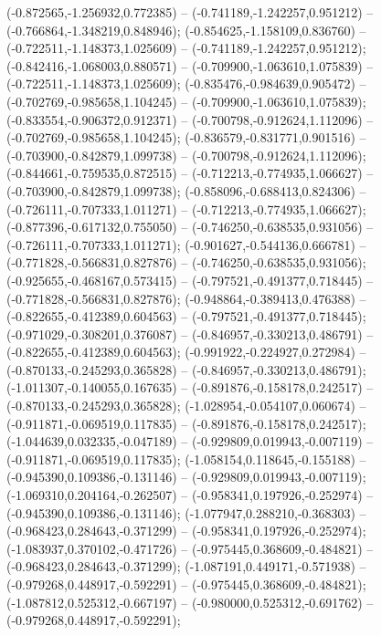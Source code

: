  (-0.872565,-1.256932,0.772385) -- (-0.741189,-1.242257,0.951212) -- (-0.766864,-1.348219,0.848946);
 (-0.854625,-1.158109,0.836760) -- (-0.722511,-1.148373,1.025609) -- (-0.741189,-1.242257,0.951212);
 (-0.842416,-1.068003,0.880571) -- (-0.709900,-1.063610,1.075839) -- (-0.722511,-1.148373,1.025609);
 (-0.835476,-0.984639,0.905472) -- (-0.702769,-0.985658,1.104245) -- (-0.709900,-1.063610,1.075839);
 (-0.833554,-0.906372,0.912371) -- (-0.700798,-0.912624,1.112096) -- (-0.702769,-0.985658,1.104245);
 (-0.836579,-0.831771,0.901516) -- (-0.703900,-0.842879,1.099738) -- (-0.700798,-0.912624,1.112096);
 (-0.844661,-0.759535,0.872515) -- (-0.712213,-0.774935,1.066627) -- (-0.703900,-0.842879,1.099738);
 (-0.858096,-0.688413,0.824306) -- (-0.726111,-0.707333,1.011271) -- (-0.712213,-0.774935,1.066627);
 (-0.877396,-0.617132,0.755050) -- (-0.746250,-0.638535,0.931056) -- (-0.726111,-0.707333,1.011271);
 (-0.901627,-0.544136,0.666781) -- (-0.771828,-0.566831,0.827876) -- (-0.746250,-0.638535,0.931056);
 (-0.925655,-0.468167,0.573415) -- (-0.797521,-0.491377,0.718445) -- (-0.771828,-0.566831,0.827876);
 (-0.948864,-0.389413,0.476388) -- (-0.822655,-0.412389,0.604563) -- (-0.797521,-0.491377,0.718445);
 (-0.971029,-0.308201,0.376087) -- (-0.846957,-0.330213,0.486791) -- (-0.822655,-0.412389,0.604563);
 (-0.991922,-0.224927,0.272984) -- (-0.870133,-0.245293,0.365828) -- (-0.846957,-0.330213,0.486791);
 (-1.011307,-0.140055,0.167635) -- (-0.891876,-0.158178,0.242517) -- (-0.870133,-0.245293,0.365828);
 (-1.028954,-0.054107,0.060674) -- (-0.911871,-0.069519,0.117835) -- (-0.891876,-0.158178,0.242517);
 (-1.044639,0.032335,-0.047189) -- (-0.929809,0.019943,-0.007119) -- (-0.911871,-0.069519,0.117835);
 (-1.058154,0.118645,-0.155188) -- (-0.945390,0.109386,-0.131146) -- (-0.929809,0.019943,-0.007119);
 (-1.069310,0.204164,-0.262507) -- (-0.958341,0.197926,-0.252974) -- (-0.945390,0.109386,-0.131146);
 (-1.077947,0.288210,-0.368303) -- (-0.968423,0.284643,-0.371299) -- (-0.958341,0.197926,-0.252974);
 (-1.083937,0.370102,-0.471726) -- (-0.975445,0.368609,-0.484821) -- (-0.968423,0.284643,-0.371299);
 (-1.087191,0.449171,-0.571938) -- (-0.979268,0.448917,-0.592291) -- (-0.975445,0.368609,-0.484821);
 (-1.087812,0.525312,-0.667197) -- (-0.980000,0.525312,-0.691762) -- (-0.979268,0.448917,-0.592291);
